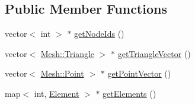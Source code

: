 \subsection*{Public Member Functions}
\begin{DoxyCompactItemize}
\item 
vector$<$ int $>$ $\ast$ \hyperlink{classmesh_1_1_mesh_a08b9ef9ed39c4252d8c5819d527b4bb5}{getNodeIds} ()
\item 
vector$<$ \hyperlink{structmesh_1_1_mesh_1_1_triangle}{Mesh::Triangle} $>$ $\ast$ \hyperlink{classmesh_1_1_mesh_adea40edfe5208ed0635d01319305a52b}{getTriangleVector} ()
\item 
vector$<$ \hyperlink{structmesh_1_1_mesh_1_1_point}{Mesh::Point} $>$ $\ast$ \hyperlink{classmesh_1_1_mesh_aee129b99bbc5ed1fc69c4b35be8e9536}{getPointVector} ()
\item 
map$<$ int, \hyperlink{structmesh_1_1_mesh_1_1_element}{Element} $>$ $\ast$ \hyperlink{classmesh_1_1_mesh_a5b766d9061fcc7ee30d6b0059cfa815f}{getElements} ()
\end{DoxyCompactItemize}
